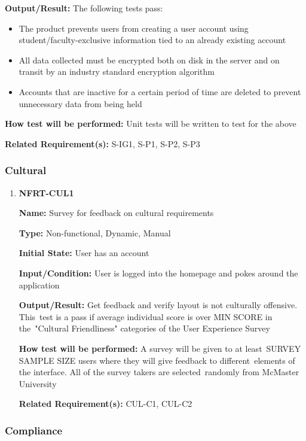 \documentclass[12pt, titlepage]{article}
\begin{document}
\begin{enumerate}
\textbf{Output/Result:} The following tests pass:
\begin{itemize}
  \item The product prevents users from creating a user account using student/faculty-exclusive information tied to an already existing account
  \item All data collected must be encrypted both on disk in the server and on transit by an industry standard encryption algorithm
  \item Accounts that are inactive for a certain period of time are deleted to prevent unnecessary data from being held
\end{itemize}

\textbf{How test will be performed:} Unit tests will be written to test for the above

\textbf{Related Requirement(s):} S-IG1, S-P1, S-P2, S-P3

\end{enumerate}

\subsubsection{Cultural}

\begin{enumerate}
\item{\textbf{NFRT-CUL1}}

\textbf{Name:} Survey for feedback on cultural requirements

\textbf{Type:} Non-functional, Dynamic, Manual

\textbf{Initial State:} User has an account

\textbf{Input/Condition:} User is logged into the homepage and pokes around the application

\textbf{Output/Result:} Get feedback and verify layout is not culturally offensive. This\
test is a pass if average individual score is over MIN SCORE in the\
"Cultural Friendliness" categories of the User Experience Survey

\textbf{How test will be performed:} A survey will be given to at least\
SURVEY SAMPLE SIZE users where they will give feedback to different\
elements of the interface. All of the survey takers are selected\
randomly from McMaster University

\textbf{Related Requirement(s):} CUL-C1, CUL-C2

\end{enumerate}

\subsubsection{Compliance}
\end{document}
